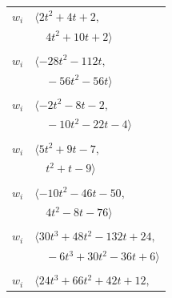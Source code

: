 \documentclass[11pt]{article}
\begin{document}
\begin{longtable}{@{}ll@{}}
$w_i$ & $\langle 2t^{2}+4t+2,$\\
 & $\quad 4t^{2}+10t+2\rangle$\\
\addlinespace[2pt]
\multicolumn{2}{@{}p{0.97\textwidth}@{}}{$i=6$, $D_i=1$, $\rho_{ij}$: $2{:}2, \allowbreak 13{:}1, \allowbreak 14{:}2, \allowbreak 22{:}1, \allowbreak 25{:}2, \allowbreak 26{:}1, \allowbreak 27{:}1, \allowbreak 32{:}2, \allowbreak 34{:}1$}\\
$w_i$ & $\langle -28t^{2}-112t,$\\
 & $\quad -56t^{2}-56t\rangle$\\
\addlinespace[2pt]
\multicolumn{2}{@{}p{0.97\textwidth}@{}}{$i=7$, $D_i=1$, $\rho_{ij}$: $0{:}2, \allowbreak 1{:}1, \allowbreak 2{:}2, \allowbreak 16{:}2, \allowbreak 17{:}1, \allowbreak 24{:}2, \allowbreak 25{:}1$}\\
$w_i$ & $\langle -2t^{2}-8t-2,$\\
 & $\quad -10t^{2}-22t-4\rangle$\\
\addlinespace[2pt]
\multicolumn{2}{@{}p{0.97\textwidth}@{}}{$i=8$, $D_i=1$, $\rho_{ij}$: $10{:}2, \allowbreak 12{:}1, \allowbreak 13{:}2, \allowbreak 15{:}2, \allowbreak 16{:}1, \allowbreak 34{:}1$}\\
$w_i$ & $\langle 5t^{2}+9t-7,$\\
 & $\quad t^{2}+t-9\rangle$\\
\addlinespace[2pt]
\multicolumn{2}{@{}p{0.97\textwidth}@{}}{$i=9$, $D_i=1$, $\rho_{ij}$: $2{:}1, \allowbreak 25{:}2, \allowbreak 26{:}1, \allowbreak 29{:}2, \allowbreak 32{:}2, \allowbreak 33{:}2$}\\
$w_i$ & $\langle -10t^{2}-46t-50,$\\
 & $\quad 4t^{2}-8t-76\rangle$\\
\addlinespace[2pt]
\multicolumn{2}{@{}p{0.97\textwidth}@{}}{$i=10$, $D_i=1$, $\rho_{ij}$: $0{:}2, \allowbreak 5{:}2, \allowbreak 8{:}1, \allowbreak 11{:}1, \allowbreak 14{:}2, \allowbreak 22{:}1, \allowbreak 25{:}2, \allowbreak 26{:}1, \allowbreak 29{:}2$}\\
$w_i$ & $\langle 30t^{3}+48t^{2}-132t+24,$\\
 & $\quad -6t^{3}+30t^{2}-36t+6\rangle$\\
\addlinespace[2pt]
\multicolumn{2}{@{}p{0.97\textwidth}@{}}{$i=11$, $D_i=1$, $\rho_{ij}$: $0{:}2, \allowbreak 2{:}1, \allowbreak 10{:}2, \allowbreak 14{:}2, \allowbreak 18{:}1, \allowbreak 19{:}2, \allowbreak 20{:}2, \allowbreak 29{:}1, \allowbreak 30{:}2$}\\
$w_i$ & $\langle 24t^{3}+66t^{2}+42t+12,$\\

\end{longtable}
\end{document}

